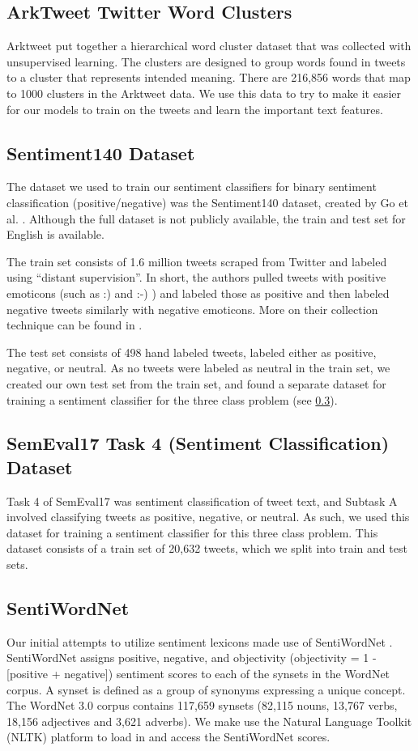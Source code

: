 \documentclass[11pt]{article}
\begin{document}
\subsection{ArkTweet Twitter Word Clusters}
Arktweet put together a hierarchical word cluster dataset that was collected with unsupervised learning. The clusters are designed to group words found in tweets to a cluster that represents intended meaning. There are 216,856 words that map to 1000 clusters in the Arktweet data. We use this data to try to make it easier for our models to train on the tweets and learn the important text features.

\subsection{Sentiment140 Dataset}
The dataset we used to train our sentiment classifiers for binary sentiment classification (positive/negative) was the Sentiment140 dataset, created by Go et al. \cite{go2009twitter}. Although the full dataset is not publicly available, the train and test set for English is available.

The train set consists of 1.6 million tweets scraped from Twitter and labeled using ``distant supervision''. In short, the authors pulled tweets with positive emoticons (such as :) and :-) ) and labeled those as positive and then labeled negative tweets similarly with negative emoticons. More on their collection technique can be found in \cite{go2009twitter}.

The test set consists of 498 hand labeled tweets, labeled either as positive, negative, or neutral. As no tweets were labeled as neutral in the train set, we created our own test set from the train set, and found a separate dataset for training a sentiment classifier for the three class problem (see \ref{subsec:sem17}).

\subsection{SemEval17 Task 4 (Sentiment Classification) Dataset}
\label{subsec:sem17}
Task 4 of SemEval17 was sentiment classification of tweet text, and Subtask A involved classifying tweets as positive, negative, or neutral. As such, we used this dataset for training a sentiment classifier for this three class problem. This dataset consists of a train set of 20,632 tweets, which we split into train and test sets.

\subsection{SentiWordNet}
Our initial attempts to utilize sentiment lexicons made use of SentiWordNet \cite{baccianella2010sentiwordnet}. SentiWordNet assigns positive, negative, and objectivity (objectivity = 1 - [positive + negative]) sentiment scores to each of the synsets in the WordNet \cite{Miller:1995:WLD:219717.219748} corpus. A synset is defined as a group of synonyms expressing a unique concept. The WordNet 3.0 corpus contains 117,659 synsets (82,115 nouns, 13,767 verbs, 18,156 adjectives and 3,621 adverbs). We make use the Natural Language Toolkit (NLTK) platform to load in and access the SentiWordNet scores.
\end{document}
